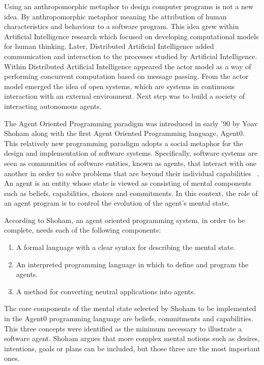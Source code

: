 \documentclass[a4paper,12pt,oneside,fleqn]{book} %
\begin{document}
Using an anthropomorphic metaphor to design computer programs is not a new
idea. By anthropomorphic metaphor meaning the attribution of human
characteristics and behaviour to a software program. This idea grew within
Artificial Intelligence research which focused on developing computational
models for human thinking. Later, Distributed Artificial Intelligence added
communication and interaction to the processes studied by Artificial
Intelligence.  Within Distributed Artificial Intelligence appeared the
actor model as a way of performing concurrent computation based on message
passing. From the actor model emerged the idea of open systems, which are
systems in continuous interaction with an external environment. Next step
was to build a society of interacting autonomous agents.

The Agent Oriented Programming paradigm was introduced in early '90 by Yoav
Shoham along with the first Agent Oriented Programming language, Agent0.
This relatively new programming paradigm adopts a social metaphor for the
design and implementation of software systems. Specifically, software
systems are seen as communities of software entities, known as agents, that
interact with one another in order to solve problems that are beyond their
individual capabilities ~\cite{DBLP:journals/ai/Shoham93}. An agent
is an entity whose state is viewed as consisting of mental components such
as beliefs, capabilities, choices and commitments. In this context, the role
of an agent program is to control the evolution of the agent's mental
state.

According to Shoham, an agent oriented programming system, in order to be
complete, needs each of the following components:
\begin{enumerate}
   \item A formal language with a clear syntax for describing the mental state.
   \item An interpreted programming language in which to define and program the agents.
   \item A method for converting neutral applications into agents.
\end{enumerate}

The core components of the mental state selected by Shoham to be
implemented in the Agent0 programming language are beliefs, commitments and
capabilities. This three concepts were identified as the minimum necessary
to illustrate a software agent. Shoham argues that more complex mental
notions such as desires, intentions, goals or plans can be included, but
those three are the most important ones.
\end{document}
